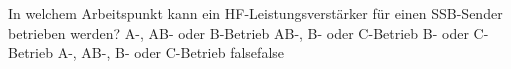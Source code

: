     {In welchem Arbeitspunkt kann ein HF-Leistungsverstärker für einen SSB-Sender betrieben werden?}
    {A-, AB- oder B-Betrieb}
    {AB-, B- oder C-Betrieb}
    {B- oder C-Betrieb}
    {A-, AB-, B- oder C-Betrieb}
    {false}{false}
